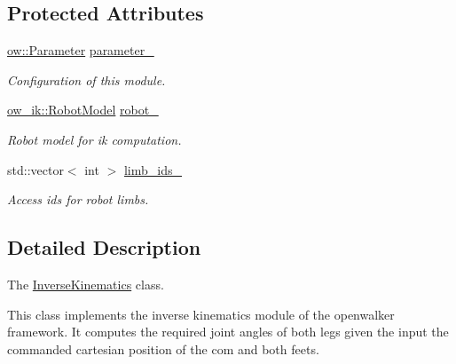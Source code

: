 \subsection*{Protected Attributes}
\begin{DoxyCompactItemize}
\item 
\hyperlink{classow_1_1Parameter}{ow\+::\+Parameter} \hyperlink{classow__ik_1_1InverseKinematics_aeb0ed705c9630e46a2654210711a626e}{parameter\+\_\+}\hypertarget{classow__ik_1_1InverseKinematics_aeb0ed705c9630e46a2654210711a626e}{}\label{classow__ik_1_1InverseKinematics_aeb0ed705c9630e46a2654210711a626e}

\begin{DoxyCompactList}\small\item\em Configuration of this module. \end{DoxyCompactList}\item 
\hyperlink{classow__ik_1_1RobotModel}{ow\+\_\+ik\+::\+Robot\+Model} \hyperlink{classow__ik_1_1InverseKinematics_a4cfa04be9d07c075015237fcd562188a}{robot\+\_\+}\hypertarget{classow__ik_1_1InverseKinematics_a4cfa04be9d07c075015237fcd562188a}{}\label{classow__ik_1_1InverseKinematics_a4cfa04be9d07c075015237fcd562188a}

\begin{DoxyCompactList}\small\item\em Robot model for ik computation. \end{DoxyCompactList}\item 
std\+::vector$<$ int $>$ \hyperlink{classow__ik_1_1InverseKinematics_a53203946edd609e6552821a1cbac921b}{limb\+\_\+ids\+\_\+}\hypertarget{classow__ik_1_1InverseKinematics_a53203946edd609e6552821a1cbac921b}{}\label{classow__ik_1_1InverseKinematics_a53203946edd609e6552821a1cbac921b}

\begin{DoxyCompactList}\small\item\em Access ids for robot limbs. \end{DoxyCompactList}\end{DoxyCompactItemize}


\subsection{Detailed Description}
The \hyperlink{classow__ik_1_1InverseKinematics}{Inverse\+Kinematics} class. 

This class implements the inverse kinematics module of the openwalker framework. It computes the required joint angles of both legs given the input the commanded cartesian position of the com and both feets. 

